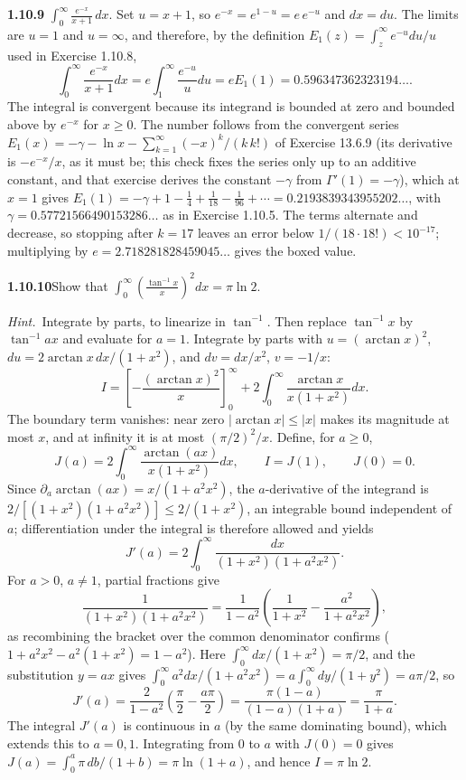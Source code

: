 \par\bigskip
\noindent\textbf{1.10.9}\quad
$\displaystyle\int_{0}^{\infty}\frac{e^{-x}}{x+1}\,dx$.
\solution
Set $u=x+1$, so $e^{-x}=e^{1-u}=e\,e^{-u}$ and $dx=du$. The limits are
$u=1$ and $u=\infty$, and therefore, by the definition
$E_1(z)=\int_z^\infty e^{-u}du/u$ used in Exercise 1.10.8,
\[
 \int_0^\infty\frac{e^{-x}}{x+1}dx
 =e\int_1^\infty\frac{e^{-u}}u du
 =\boxed{eE_1(1)=0.596347362323194\ldots}.
\]
The integral is convergent because its integrand is bounded at zero
and bounded above by $e^{-x}$ for $x\ge0$. The number follows from the
convergent series
$E_1(x)=-\gamma-\ln x-\sum_{k=1}^\infty(-x)^k/(k\,k!)$ of Exercise
13.6.9 (its derivative is $-e^{-x}/x$, as it must be; this check fixes
the series only up to an additive constant, and that exercise derives
the constant $-\gamma$ from $\Gamma'(1)=-\gamma$), which at $x=1$ gives
$E_1(1)=-\gamma+1-\frac14+\frac1{18}-\frac1{96}+\cdots
=0.2193839343955202\ldots$, with $\gamma=0.57721566490153286\ldots$ as
in Exercise 1.10.5.
The terms alternate and decrease, so stopping after $k=17$ leaves an
error below $1/(18\cdot18!)<10^{-17}$; multiplying by
$e=2.718281828459045\ldots$ gives the boxed value.


\par\bigskip
\noindent\textbf{1.10.10}\quad Show that
$\displaystyle\int_{0}^{\infty}\left(\frac{\tan^{-1}x}{x}\right)^{2}dx
=\pi\ln2$.

\emph{Hint.}~Integrate by parts, to linearize in $\tan^{-1}$. Then replace
$\tan^{-1}x$ by $\tan^{-1}ax$ and evaluate for $a=1$.
\solution
Integrate by parts with $u=(\arctan x)^2$, $du=2\arctan x\,dx/(1+x^2)$,
and $dv=dx/x^2$, $v=-1/x$:
\[
 I=\left[-\frac{(\arctan x)^2}{x}\right]_0^\infty
       +2\int_0^\infty\frac{\arctan x}{x(1+x^2)}dx.
\]
The boundary term vanishes: near zero $|\arctan x|\le|x|$ makes its
magnitude at most $x$, and at infinity it is at most
$(\pi/2)^2/x$. Define, for $a\ge0$,
\[
 J(a)=2\int_0^\infty\frac{\arctan(ax)}{x(1+x^2)}dx,
 \qquad I=J(1),\qquad J(0)=0.
\]
Since $\partial_a\arctan(ax)=x/(1+a^2x^2)$, the $a$-derivative of the
integrand is $2/[(1+x^2)(1+a^2x^2)]\le2/(1+x^2)$, an integrable bound
independent of $a$; differentiation under the integral is therefore
allowed and yields
\[
 J'(a)=2\int_0^\infty\frac{dx}{(1+x^2)(1+a^2x^2)}.
\]
For $a>0$, $a\ne1$, partial fractions give
\[
 \frac1{(1+x^2)(1+a^2x^2)}
 =\frac1{1-a^2}\left(\frac1{1+x^2}-\frac{a^2}{1+a^2x^2}\right),
\]
as recombining the bracket over the common denominator confirms
($1+a^2x^2-a^2(1+x^2)=1-a^2$). Here $\int_0^\infty dx/(1+x^2)=\pi/2$,
and the substitution $y=ax$ gives
$\int_0^\infty a^2dx/(1+a^2x^2)=a\int_0^\infty dy/(1+y^2)=a\pi/2$, so
\[
 J'(a)=\frac{2}{1-a^2}\left(\frac\pi2-\frac{a\pi}2\right)
 =\frac{\pi(1-a)}{(1-a)(1+a)}=\frac\pi{1+a}.
\]
The integral $J'(a)$ is continuous in $a$ (by the same dominating
bound), which extends this to $a=0,1$. Integrating from $0$ to $a$ with
$J(0)=0$ gives $J(a)=\int_0^a\pi\,db/(1+b)=\pi\ln(1+a)$, and hence
$\boxed{I=\pi\ln2}$.


